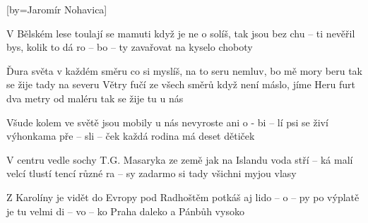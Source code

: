 [by={Jaromír Nohavica}]

\beginverse{}
V Bělském lese toulají se mamuti
když je ne o solíš, tak jsou bez chu -- ti
nevěřil bys, kolik to dá ro -- bo -- ty
zavařovat na kyselo choboty
\endverse{}

\beginchorus{}
Ďura světa v každém směru
co si myslíš, na to seru
nemluv, bo mě mory beru
tak se žije tady na severu
Větry fučí ze všech směrů
když není máslo, jíme Heru
furt dva metry od maléru
tak se žije tu u nás
\endchorus{}

\beginverse{}
Všude kolem ve světě jsou mobily
u nás nevyroste ani o - bi -- lí
psi se živí výhonkama pře -- sli -- ček
každá rodina má deset dětiček
\endverse{}

\beginchorus{}
\phantom{}
\endchorus{}

\beginverse{}
V centru vedle sochy T.G. Masaryka
ze země jak na Islandu voda stří -- ká
malí velcí tlustí tencí různé ra -- sy
zadarmo si tady všichni myjou vlasy
\endverse{}

\beginchorus{}
\phantom{}
\endchorus{}

\beginverse{}
Z Karolíny je vidět do Evropy 
pod Radhoštěm potkáš aj lido -- o -- py
po výplatě je tu velmi di -- vo -- ko
Praha daleko a Pánbůh vysoko
\endverse{}

\beginchorus{}
\phantom{}
\endchorus{}

\endsong{}
